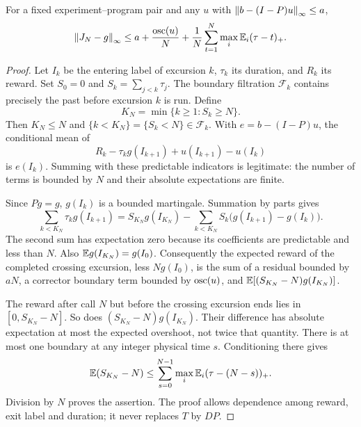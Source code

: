 \begin{lemma}\label{lem:physical}
For a fixed experiment--program pair and any $u$ with $\left\lVert b-(I-P)u\right\rVert_\infty\le a$,
\[
 \left\lVert J_N-g\right\rVert_\infty
 \le a+\frac{\operatorname{osc}(u)}N+\frac1N\sum_{t=1}^N\max_i\mathbb E_i(\tau-t)_+.
\]
\end{lemma}
\begin{proof}
Let $I_k$ be the entering label of excursion $k$, $\tau_k$ its duration, and $R_k$ its reward. Set $S_0=0$ and $S_k=\sum_{j<k}\tau_j$. The boundary filtration $\mathcal F_k$ contains precisely the past before excursion $k$ is run. Define
\[
 K_N=\min\{k\ge1:S_k\ge N\}.
\]
Then $K_N\le N$ and $\{k<K_N\}=\{S_k<N\}\in\mathcal F_k$. With $e=b-(I-P)u$, the conditional mean of
\[
 R_k-\tau_k g(I_{k+1})+u(I_{k+1})-u(I_k)
\]
is $e(I_k)$. Summing with these predictable indicators is legitimate: the number of terms is bounded by $N$ and their absolute expectations are finite.

Since $Pg=g$, $g(I_k)$ is a bounded martingale. Summation by parts gives
\[
 \sum_{k<K_N}\tau_k g(I_{k+1})
 =S_{K_N}g(I_{K_N})-
   \sum_{k<K_N}S_k\bigl(g(I_{k+1})-g(I_k)\bigr).
\]
The second sum has expectation zero because its coefficients are predictable and less than $N$. Also $\mathbb E g(I_{K_N})=g(I_0)$. Consequently the expected reward of the completed crossing excursion, less $Ng(I_0)$, is the sum of a residual bounded by $aN$, a corrector boundary term bounded by $\operatorname{osc}(u)$, and $\mathbb E[(S_{K_N}-N)g(I_{K_N})]$.

The reward after call $N$ but before the crossing excursion ends lies in $[0,S_{K_N}-N]$. So does $(S_{K_N}-N)g(I_{K_N})$. Their difference has absolute expectation at most the expected overshoot, not twice that quantity. There is at most one boundary at any integer physical time $s$. Conditioning there gives
\[
 \mathbb E(S_{K_N}-N)\le
 \sum_{s=0}^{N-1}\max_i\mathbb E_i(\tau-(N-s))_+.
\]
Division by $N$ proves the assertion. The proof allows dependence among reward, exit label and duration; it never replaces $T$ by $DP$.
\end{proof}

